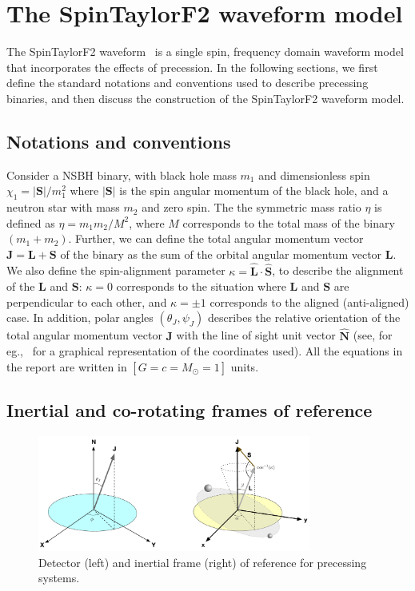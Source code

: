 \chapter{The SpinTaylorF2 waveform model} 

\label{chap:SpinTaylorF2} 
The SpinTaylorF2 waveform~\cite{Lundgren2014} is a single spin, frequency
domain waveform model that incorporates the effects of precession. In the
following sections, we first define the standard notations and conventions
used to describe precessing binaries, and then discuss the construction of the
SpinTaylorF2 waveform model.

\section{Notations and conventions}
Consider a NSBH binary, with black hole mass $m_{1}$ and dimensionless spin
$\chi_{1} = |\mathbf{S}|/m_{1}^2$ where $|\mathbf{S}|$ is the spin angular
momentum of the black hole, and a neutron star with mass $m_{2}$ and zero
spin. The the symmetric mass ratio $\eta$ is defined as $\eta=m_{1}m_{2}/M^2$,
where $M$ corresponds to the total mass of the binary $(m_{1} + m_{2})$.
Further, we can define the total angular momentum vector
$\mathbf{J}=\mathbf{L} + \mathbf{S}$ of the binary as the sum of the orbital
angular momentum vector $\mathbf{L}$. We also define the spin-alignment parameter
$\kappa=\hat{\mathbf{L}}\cdot\hat{\mathbf{S}}$, to describe the alignment of
the $\mathbf{L}$ and $\mathbf{S}$: $\kappa=0$ corresponds to the situation
where $\mathbf{L}$ and $\mathbf{S}$ are perpendicular to each other, and
$\kappa=\pm 1$ corresponds to the aligned (anti-aligned) case. In addition,
polar angles $(\theta_{J}, \psi_{J})$  describes the relative orientation  of
the total angular momentum vector $\mathbf{J}$ with the line of sight unit
vector $\hat{\mathbf{N}}$ (see, for eg.,~\cite{thetaJ} for a graphical
representation of the coordinates used). All the equations in the report are
written in $\left[G = c = M_{\odot }= 1\right]$ units.

\section{Inertial and co-rotating frames of reference}


\begin{figure}[t]
\includegraphics[width=0.8\textwidth]{./images/STF2_coordinates.pdf}
\centering 
\caption{Detector (left) and inertial frame (right) of reference for
precessing systems.}
\centering 
\label{fig:frames} 
\end{figure}

